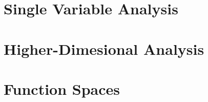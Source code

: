 \documentclass[12pt, a4paper, oneside, openright, titlepage]{book}
\begin{document}
\tableofcontents

\part{Single Variable Analysis}


















\part{Higher-Dimesional Analysis}































\part{Function Spaces}
\end{document}
